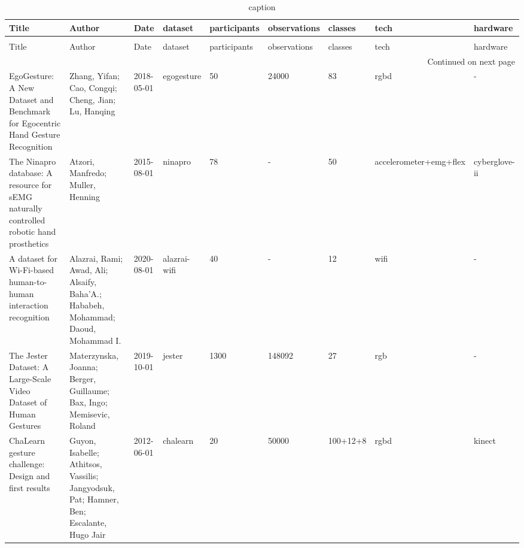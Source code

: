 \begin{longtable}{p{}p{}p{}llllll}
\caption{caption} \label{tab:} \\
\toprule
Title & Author & Date & dataset & participants & observations & classes & tech & hardware \\
\midrule
\endfirsthead
\caption[]{caption} \\
\toprule
Title & Author & Date & dataset & participants & observations & classes & tech & hardware \\
\midrule
\endhead
\midrule
\multicolumn{9}{r}{Continued on next page} \\
\midrule
\endfoot
\bottomrule
\endlastfoot
EgoGesture: A New Dataset and Benchmark for Egocentric Hand Gesture Recognition & Zhang, Yifan; Cao, Congqi; Cheng, Jian; Lu, Hanqing & 2018-05-01 & egogesture & 50 & 24000 & 83 & rgbd & - \\
The Ninapro database: A resource for sEMG naturally controlled robotic hand prosthetics & Atzori, Manfredo; Muller, Henning & 2015-08-01 & ninapro & 78 & - & 50 & accelerometer+emg+flex & cyberglove-ii \\
A dataset for Wi-Fi-based human-to-human interaction recognition & Alazrai, Rami; Awad, Ali; Alsaify, Baha’A.; Hababeh, Mohammad; Daoud, Mohammad I. & 2020-08-01 & alazrai-wifi & 40 & - & 12 & wifi & - \\
The Jester Dataset: A Large-Scale Video Dataset of Human Gestures & Materzynska, Joanna; Berger, Guillaume; Bax, Ingo; Memisevic, Roland & 2019-10-01 & jester & 1300 & 148092 & 27 & rgb & - \\
ChaLearn gesture challenge: Design and first results & Guyon, Isabelle; Athitsos, Vassilis; Jangyodsuk, Pat; Hamner, Ben; Escalante, Hugo Jair & 2012-06-01 & chalearn & 20 & 50000 & 100+12+8 & rgbd & kinect \\
\end{longtable}
